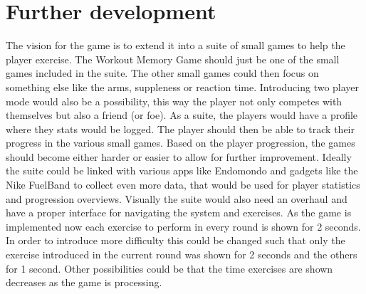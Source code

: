 \documentclass[11pt]{report}
\begin{document}
\section{Further development}
The vision for the game is to extend it into a suite of small games to help the player exercise. The Workout Memory Game should just be one of the small games included in the suite. The other small games could then focus on something else like the arms, suppleness or reaction time. Introducing two player mode would also be a possibility, this way the player not only competes with themselves but also a friend (or foe). As a suite, the players would have a profile where they stats would be logged. The player should then be able to track their progress in the various small games. Based on the player progression, the games should become either harder or easier to allow for further improvement. Ideally the suite could be linked with various apps like Endomondo and gadgets like the Nike FuelBand to collect even more data, that would be used for player statistics and progression overviews. Visually the suite would also need an overhaul and have a proper interface for navigating the system and exercises. As the game is implemented now each exercise to perform in every round is shown for 2 seconds. In order to introduce more difficulty this could be changed such that only the exercise introduced in the current round was shown for 2 seconds and the others for 1 second. Other possibilities could be that the time exercises are shown decreases as the game is processing.
\end{document}
